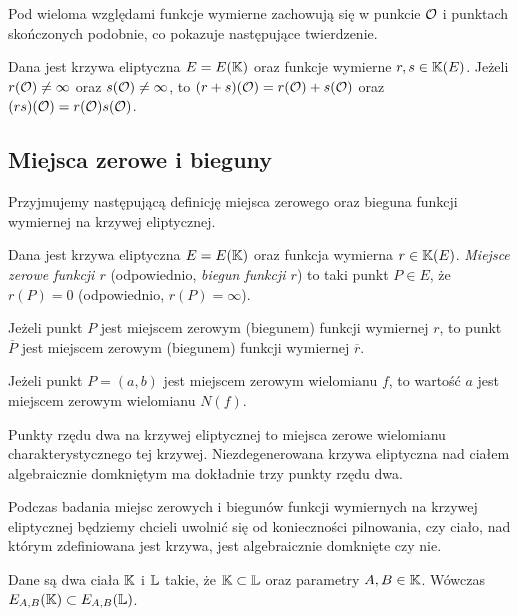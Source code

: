 Pod wieloma względami funkcje wymierne zachowują się
w punkcie $\mathcal{O}$ i punktach skończonych podobnie,
co pokazuje następujące twierdzenie.

\begin{theorem}
Dana jest krzywa eliptyczna $E = E(\mathbb{K})$
oraz funkcje wymierne $r, s \in \mathbb{K}(E)$.
Jeżeli $r(\mathcal{O}) \neq \infty$ oraz $s(\mathcal{O}) \neq \infty$,
to $(r + s)(\mathcal{O}) = r(\mathcal{O}) + s(\mathcal{O})$
oraz $(rs)(\mathcal{O}) = r(\mathcal{O})s(\mathcal{O})$.
\end{theorem}

\subsection*{Miejsca zerowe i bieguny}

Przyjmujemy następującą definicję
miejsca zerowego oraz bieguna funkcji wymiernej na krzywej eliptycznej.

\begin{definition}
Dana jest krzywa eliptyczna $E = E(\mathbb{K})$
oraz funkcja wymierna $r \in \mathbb{K}(E)$.
\emph{Miejsce zerowe funkcji $r$} (odpowiednio, \emph{biegun funkcji $r$})
to taki punkt $P \in E$, że $r(P) = 0$ (odpowiednio, $r(P) = \infty$).
\end{definition}

\begin{fact}
Jeżeli punkt $P$
jest miejscem zerowym (biegunem) funkcji wymiernej $r$,
to punkt $\overline{P}$
jest miejscem zerowym (biegunem) funkcji wymiernej $\overline{r}$.
\end{fact}

\begin{corollary}\label{zero_of_norm_coro}
Jeżeli punkt $P = (a, b)$ jest miejscem zerowym wielomianu $f$,
to wartość $a$ jest miejscem zerowym wielomianu $N(f)$.
\end{corollary}

\begin{fact}
Punkty rzędu dwa na krzywej eliptycznej
to miejsca zerowe wielomianu charakterystycznego tej krzywej.
Niezdegenerowana krzywa eliptyczna nad ciałem algebraicznie domkniętym
ma dokładnie trzy punkty rzędu dwa.
\end{fact}

Podczas badania miejsc zerowych i biegunów
funkcji wymiernych na krzywej eliptycznej
będziemy chcieli uwolnić się od konieczności pilnowania,
czy ciało, nad którym zdefiniowana jest krzywa,
jest algebraicznie domknięte czy nie.

\begin{fact}
Dane są dwa ciała $\mathbb{K}$ i $\mathbb{L}$ takie, że $\mathbb{K} \subset \mathbb{L}$
oraz parametry $A,B \in \mathbb{K}$.
Wówczas $E_{A,B}(\mathbb{K}) \subset E_{A,B}(\mathbb{L})$.
\end{fact}


